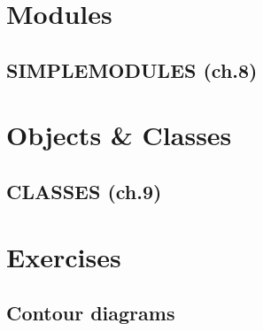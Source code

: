 \documentclass[11pt,a4paper]{book}
\begin{document}
\chapter{Modules}

\section{SIMPLEMODULES (ch.8)}


\chapter{Objects \& Classes}

\section{CLASSES (ch.9)}


\backmatter
\appendix

\chapter{Exercises}

\section{Contour diagrams}



\nocite{*}
\printbibliography
\end{document}
